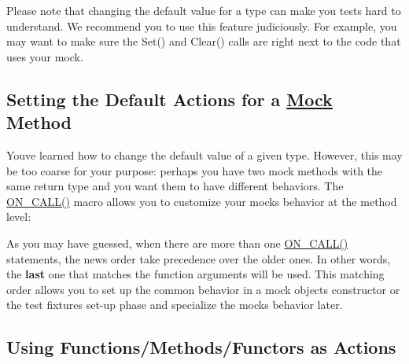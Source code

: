 Please note that changing the default value for a type can make you tests hard to understand. We recommend you to use this feature judiciously. For example, you may want to make sure the {\ttfamily Set()} and {\ttfamily Clear()} calls are right next to the code that uses your mock.

\subsection*{Setting the Default Actions for a \mbox{\hyperlink{classMock}{Mock}} Method}

You\textquotesingle{}ve learned how to change the default value of a given type. However, this may be too coarse for your purpose\+: perhaps you have two mock methods with the same return type and you want them to have different behaviors. The {\ttfamily \mbox{\hyperlink{gmock-spec-builders_8h_a5b12ae6cf84f0a544ca811b380c37334}{O\+N\+\_\+\+C\+A\+L\+L()}}} macro allows you to customize your mock\textquotesingle{}s behavior at the method level\+:


\begin{DoxyCode}{0}
\DoxyCodeLine{}
\DoxyCodeLine{}
\end{DoxyCode}


As you may have guessed, when there are more than one {\ttfamily \mbox{\hyperlink{gmock-spec-builders_8h_a5b12ae6cf84f0a544ca811b380c37334}{O\+N\+\_\+\+C\+A\+L\+L()}}} statements, the news order take precedence over the older ones. In other words, the {\bfseries{last}} one that matches the function arguments will be used. This matching order allows you to set up the common behavior in a mock object\textquotesingle{}s constructor or the test fixture\textquotesingle{}s set-\/up phase and specialize the mock\textquotesingle{}s behavior later.

\subsection*{Using Functions/\+Methods/\+Functors as Actions}


